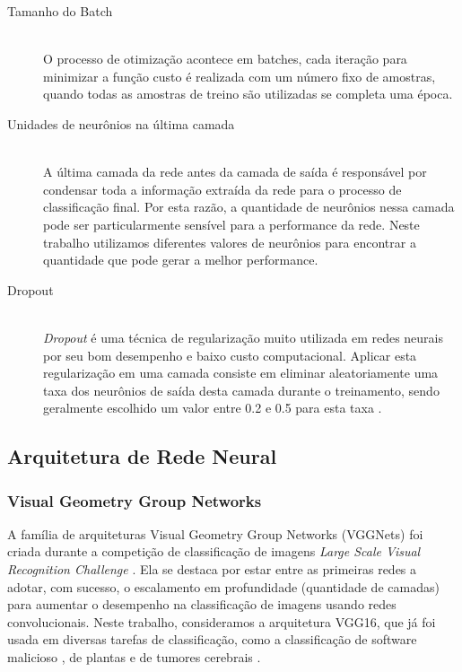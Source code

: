 \begin{description}
  \item[Tamanho do Batch] \hfill \\
        O processo de otimização acontece em batches, cada iteração para minimizar a função custo é realizada com um número fixo de amostras, quando todas as amostras de treino são utilizadas se completa uma época.

  \item[Unidades de neurônios na última camada]
        \hfill \\
        A última camada da rede antes da camada de saída é responsável por condensar toda a informação extraída da rede para o processo de classificação final. Por esta razão, a quantidade de neurônios nessa camada pode ser particularmente sensível para a performance da rede. Neste trabalho utilizamos diferentes valores de neurônios para encontrar a quantidade que pode gerar a melhor performance.

  \item[Dropout]
        \hfill \\
        \emph{Dropout} \cite{dropout} é uma técnica de regularização muito utilizada em redes neurais por seu bom desempenho e baixo custo computacional. Aplicar esta regularização em uma camada consiste em eliminar aleatoriamente uma taxa dos neurônios de saída desta camada durante o treinamento, sendo geralmente escolhido um valor entre 0.2 e 0.5 para esta taxa \cite{CholletBook}.
\end{description}












\subsection{Arquitetura de Rede Neural}
\label{sec:arch}

\subsubsection{Visual Geometry Group Networks}
\label{sec:vgg}
A família de arquiteturas Visual Geometry Group Networks (VGGNets) \cite{VGG16} foi criada durante a competição de classificação de imagens \textit{Large Scale Visual Recognition Challenge} \cite{ILSVRC15}. Ela se destaca por estar entre as primeiras redes a adotar, com sucesso, o escalamento em profundidade (quantidade de camadas) para aumentar o desempenho na classificação de imagens usando redes convolucionais. Neste trabalho, consideramos a arquitetura VGG16, que já foi usada em diversas tarefas de classificação, como a classificação de software malicioso \cite{VGG16Ex01}, de plantas \cite{VGG16Ex02} e de tumores cerebrais \cite{VGG16Ex03}.

